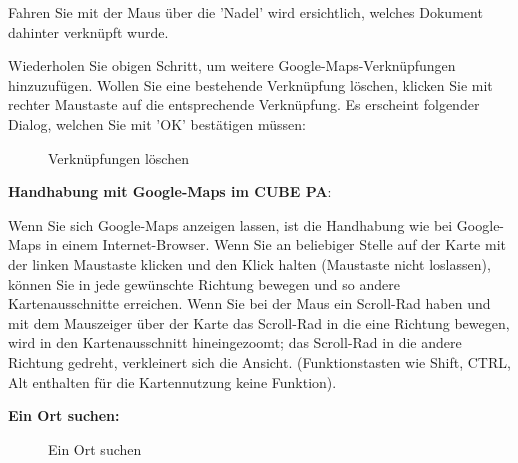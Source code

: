 Fahren Sie mit der Maus über die 'Nadel' wird ersichtlich, welches Dokument dahinter verknüpft wurde.

\vspace{3mm}

Wiederholen Sie obigen Schritt, um weitere Google-Maps-Verknüpfungen hinzuzufügen. Wollen Sie eine bestehende Verknüpfung löschen, klicken Sie mit rechter Maustaste auf die entsprechende Verknüpfung. Es erscheint folgender Dialog, welchen Sie mit 'OK' bestätigen müssen: 

\begin{figure}[H]
\caption{Verknüpfungen löschen}
\end{figure}

\vspace{\baselineskip}
\pagebreak

\textbf{Handhabung mit Google-Maps im CUBE PA}:

Wenn Sie sich Google-Maps anzeigen lassen, ist die Handhabung wie bei Google-Maps in einem Internet-Browser. Wenn Sie an beliebiger Stelle auf der Karte mit der linken Maustaste klicken und den Klick halten (Maustaste nicht loslassen), können Sie in jede gewünschte Richtung bewegen und so andere Kartenausschnitte erreichen. Wenn Sie bei der Maus ein Scroll-Rad haben und mit dem Mauszeiger über der Karte das Scroll-Rad in die eine Richtung bewegen, wird in den Kartenausschnitt hineingezoomt; das Scroll-Rad in die andere Richtung gedreht, verkleinert sich die Ansicht. (Funktionstasten wie Shift, CTRL, Alt enthalten für die Kartennutzung keine Funktion).

\vspace{\baselineskip}

\textbf{Ein Ort suchen:} 

\begin{figure}[H]
\caption{Ein Ort suchen}
\end{figure}


